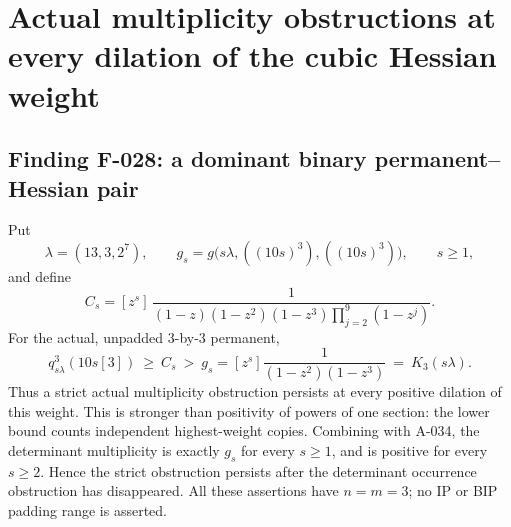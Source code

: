 \section{Actual multiplicity obstructions at every dilation of the cubic Hessian weight}

\subsection*{Finding F-028: a dominant binary permanent--Hessian pair}
Put
\[
 \lambda=(13,3,2^7),\qquad
 g_s=g\bigl(s\lambda,((10s)^3),((10s)^3)\bigr),\qquad s\geq1,
\]
and define
\[
 C_s=[z^s]\,
   \frac{1}
   {(1-z)(1-z^2)(1-z^3)\prod_{j=2}^{9}(1-z^j)}.
                                                               \tag{F-028.1}
\]
For the actual, unpadded \(3\)-by-\(3\) permanent,
\[
 \boxed{\quad
 q^3_{s\lambda}(10s[3])
       \ \geq\ C_s\ >\
 g_s=[z^s]\frac1{(1-z^2)(1-z^3)}
       \ =\ K_3(s\lambda).
 \quad}                                                        \tag{F-028.2}
\]
Thus a strict actual multiplicity obstruction persists
at every positive dilation of this weight.
This is stronger than positivity of powers of one section:
the lower bound counts independent highest-weight copies.
Combining with A-034, the determinant multiplicity is
exactly \(g_s\) for every \(s\geq1\), and is positive
for every \(s\geq2\).
Hence the strict obstruction persists after the determinant
occurrence obstruction has disappeared.
All these assertions have \(n=m=3\); no IP or BIP padding
range is asserted.

